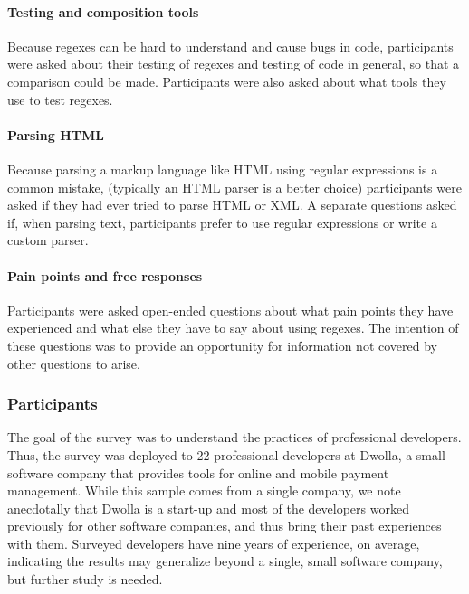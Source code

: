 \paragraph{Testing and composition tools} Because regexes can be hard to understand and cause bugs in code, participants were asked about their testing of regexes and testing of code in general, so that a comparison could be made.  Participants were also asked about what tools they use to test regexes.

\paragraph{Parsing HTML} Because parsing a markup language like HTML using regular expressions is a common mistake, (typically an HTML parser is a better choice) participants were asked if they had ever tried to parse HTML or XML.  A separate questions asked if, when parsing text, participants prefer to use regular expressions or write a custom parser.

\paragraph{Pain points and free responses} Participants were asked open-ended questions about what pain points they have experienced and what else they have to say about using regexes.  The intention of these questions was to provide an opportunity for information not covered by other questions to arise.

\subsubsection{Participants}
The goal of the survey was to understand the practices of professional developers. Thus, the survey was deployed to 22 professional developers at Dwolla, a small software company that provides tools for online and mobile payment management. While this sample comes from a single company, we note anecdotally that Dwolla is a start-up and most of the developers worked previously for other software companies, and thus bring their past experiences with them. Surveyed developers have nine years of experience, on average, indicating the results may generalize beyond a single, small software company, but further study is needed.
